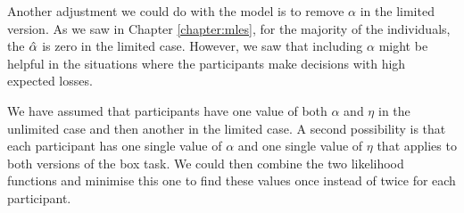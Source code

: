 


Another adjustment we could do with the model is to remove $\alpha$ in the limited version. As we saw in Chapter \ref{chapter:mles},
for the majority of the individuals, the $\hat{\alpha}$ is zero in the limited case. However, we saw that including $\alpha$ might be helpful in the situations where the participants make decisions with high expected losses. 

We have assumed that participants have one value of both $\alpha$ and $\eta$ in the unlimited case and then another in the limited case. A second possibility is that each participant has one single value of $\alpha$ and one single value of $\eta$ that applies to both versions of the box task. We could then combine the two likelihood functions and minimise this one to find these values once instead of twice for each participant. 

